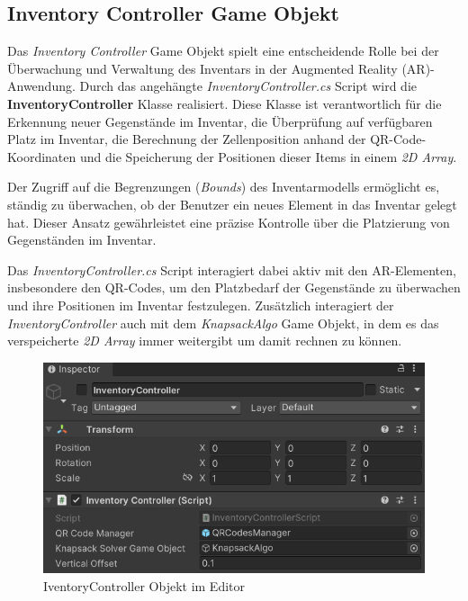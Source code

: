 \subsection{Inventory Controller Game Objekt}
Das \textit{Inventory Controller} Game Objekt spielt eine entscheidende Rolle bei der Überwachung und Verwaltung des
Inventars in der Augmented Reality (AR)-Anwendung. Durch das angehängte \textit{InventoryController.cs} Script wird die
\textbf{InventoryController} Klasse realisiert. Diese Klasse ist verantwortlich für die Erkennung neuer Gegenstände im
Inventar, die Überprüfung auf verfügbaren Platz im Inventar, die Berechnung der Zellenposition anhand der QR-Code-Koordinaten
und die Speicherung der Positionen dieser Items in einem \textit{2D Array}.

Der Zugriff auf die Begrenzungen (\textit{Bounds}) des Inventarmodells ermöglicht es, ständig zu überwachen, ob der
Benutzer ein neues Element in das Inventar gelegt hat. Dieser Ansatz gewährleistet eine präzise Kontrolle über die
Platzierung von Gegenständen im Inventar.

Das \textit{InventoryController.cs} Script interagiert dabei aktiv mit den AR-Elementen, insbesondere den QR-Codes, um
den Platzbedarf der Gegenstände zu überwachen und ihre Positionen im Inventar festzulegen. Zusätzlich interagiert der
\textit{InventoryController} auch mit dem \textit{KnapsackAlgo} Game Objekt, in dem es das verspeicherte \textit{2D Array}
immer weitergibt um damit rechnen zu können.\\

\begin{figure}[h]
    \centering
    \includegraphics[scale=0.8]{images/invCon_Editor}
    \caption{IventoryController Objekt im Editor}
    \label{fig:InventoryController_Editor}
\end{figure}


